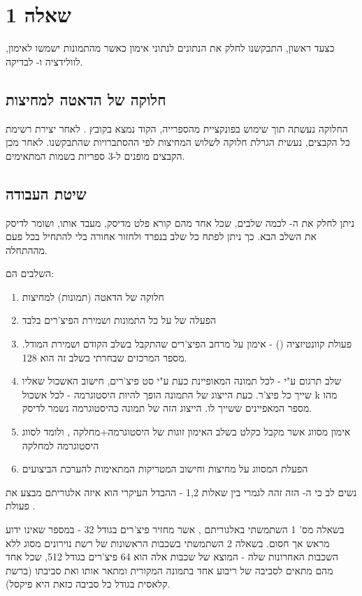 
\section*{שאלה {1}}
כצעד ראשון, התבקשנו לחלק את הנתונים לנתוני אימון 
 כאשר
 מהתמונות ישמשו לאימון,  לוולידציה ו-  לבדיקה.
\medskip
\subsection*{חלוקה של הדאטה למחיצות}
החלוקה נעשתה תוך שימוש בפונקציית  מהספרייה, הקוד נמצא בקובץ .\newline
לאחר יצירת רשימת כל הקבצים, נעשית הגרלת חלוקה לשלוש המחיצות
לפי ההסתברויות שהתבקשנו. לאחר מכן הקבצים מופנים ל-3 ספריות בשמות המתאימים.

\subsection*{שיטת העבודה}
ניתן לחלק את ה- לכמה שלבים, שכל אחד מהם קורא פלט מדיסק, מעבד אותו, ושומר לדיסק את השלב הבא.
\newline
כך ניתן לפתח כל שלב בנפרד ולחזור אחורה בלי להתחיל בכל פעם מההתחלה.

השלבים הם:
\begin{enumerate}[start=0]
\item חלוקה של הדאטה (תמונות) למחיצות
\item הפעלה של  על כל התמונות ושמירת הפיצ'רים בלבד
\item פעולת קוונטיזציה ()  - אימון  על מרחב הפיצ'רים שהתקבל בשלב הקודם ושמירת המודל. מספר המרכזים שבחרתי בשלב זה הוא 128.
\item שלב תרגום ע"י  - לכל תמונה המאופיינת כעת ע"י סט פיצ'רים, חישוב האשכול  שאליו שייך כל פיצ'ר. כעת הייצוג של התמונה הופך להיות היסטוגרמה - לכל אשכול k מהו מספר המאפיינים ששייך לו.\newline
הייצוג הזה של תמונה כהיסטוגרמה נשמר לדיסק.
\item אימון מסווג אשר מקבל כקלט בשלב האימון זוגות של היסטוגרמה+מחלקה , ולומד לסווג היסטוגרמה למחלקה
\item הפעלת המסווג על מחיצות  וחישוב המטריקות המתאימות להערכת הביצועים
\end{enumerate}
\par
נשים לב כי ה- הזה זהה לגמרי בין שאלות 1,2 - ההבדל העיקרי הוא איזה אלגוריתם מבצע את פעולת .\par
בשאלה מס' 1 השתמשתי באלגוריתם , אשר מחזיר פיצ'רים בגודל 32 - במספר שאינו ידוע מראש אך חסום.\newline
בשאלה 2 השתמשתי בשכבות הראשונות של רשת נוירונים מסוג  ללא השכבות האחרונות שלה - המוצא של שכבות אלה הוא 64 פיצ'רים בגודל 512, שכל אחד מהם מתאים לסביבה של ריבוע אחד בתמונה המקורית ומתאר אותו ואת סביבתו (ברשת קלאסית בגודל  כל סביבה כזאת היא פיקסל).

